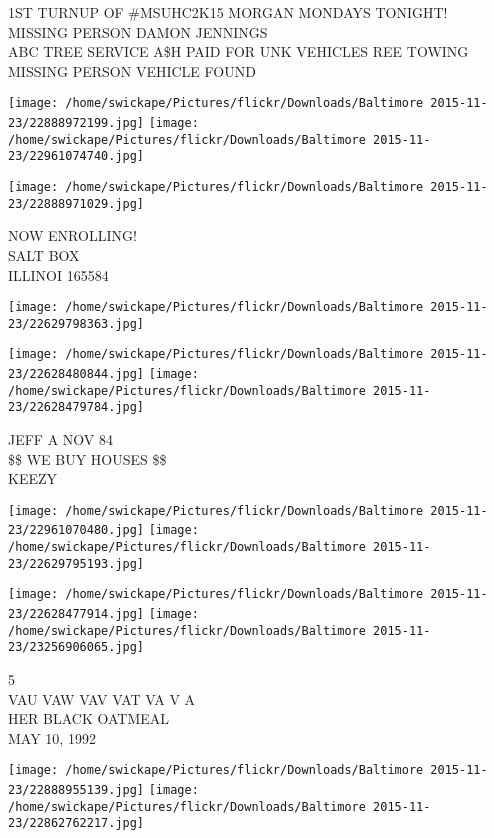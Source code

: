 \documentclass[10pt,letterpaper]{article}
\begin{document}
1ST TURNUP OF \#MSUHC2K15 MORGAN MONDAYS TONIGHT!\\
MISSING PERSON DAMON JENNINGS\\
ABC TREE SERVICE A\$H PAID FOR UNK VEHICLES REE TOWING\\
MISSING PERSON VEHICLE FOUND\\
\pagebreak

\texttt{[image: /home/swickape/Pictures/flickr/Downloads/Baltimore 2015-11-23/22888972199.jpg]}
\texttt{[image: /home/swickape/Pictures/flickr/Downloads/Baltimore 2015-11-23/22961074740.jpg]}

\texttt{[image: /home/swickape/Pictures/flickr/Downloads/Baltimore 2015-11-23/22888971029.jpg]}

NOW ENROLLING!\\
SALT BOX\\
ILLINOI 165584\\
\pagebreak

\texttt{[image: /home/swickape/Pictures/flickr/Downloads/Baltimore 2015-11-23/22629798363.jpg]}

\vspace{0.25in}
\texttt{[image: /home/swickape/Pictures/flickr/Downloads/Baltimore 2015-11-23/22628480844.jpg]}
\texttt{[image: /home/swickape/Pictures/flickr/Downloads/Baltimore 2015-11-23/22628479784.jpg]}

JEFF A NOV 84\\
\$\$ WE BUY HOUSES \$\$\\
KEEZY\\
\pagebreak

\texttt{[image: /home/swickape/Pictures/flickr/Downloads/Baltimore 2015-11-23/22961070480.jpg]}
\texttt{[image: /home/swickape/Pictures/flickr/Downloads/Baltimore 2015-11-23/22629795193.jpg]}

\texttt{[image: /home/swickape/Pictures/flickr/Downloads/Baltimore 2015-11-23/22628477914.jpg]}
\texttt{[image: /home/swickape/Pictures/flickr/Downloads/Baltimore 2015-11-23/23256906065.jpg]}

5\\
VAU VAW VAV VAT VA V A\\
HER BLACK OATMEAL\\
MAY 10, 1992\\
\pagebreak

\texttt{[image: /home/swickape/Pictures/flickr/Downloads/Baltimore 2015-11-23/22888955139.jpg]}
\texttt{[image: /home/swickape/Pictures/flickr/Downloads/Baltimore 2015-11-23/22862762217.jpg]}
\end{document}
